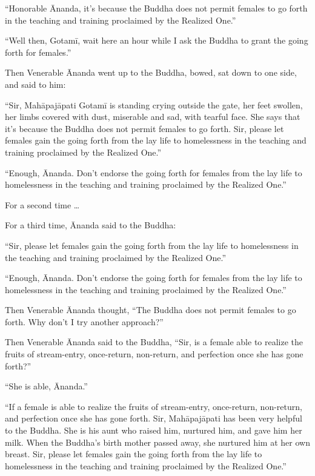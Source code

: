 \documentclass[12pt,openany]{book}%
\begin{document}
“Honorable Ānanda, it’s because the Buddha does not permit females to go forth in the teaching and training proclaimed by the Realized One.” 

“Well then, \textsanskrit{Gotamī}, wait here an hour while I ask the Buddha to grant the going forth for females.” 

Then Venerable Ānanda went up to the Buddha, bowed, sat down to one side, and said to him: 

“Sir, \textsanskrit{Mahāpajāpati} \textsanskrit{Gotamī} is standing crying outside the gate, her feet swollen, her limbs covered with dust, miserable and sad, with tearful face. She says that it’s because the Buddha does not permit females to go forth. Sir, please let females gain the going forth from the lay life to homelessness in the teaching and training proclaimed by the Realized One.” 

“Enough, Ānanda. Don’t endorse the going forth for females from the lay life to homelessness in the teaching and training proclaimed by the Realized One.” 

For a second time … 

For a third time, Ānanda said to the Buddha: 

“Sir, please let females gain the going forth from the lay life to homelessness in the teaching and training proclaimed by the Realized One.” 

“Enough, Ānanda. Don’t endorse the going forth for females from the lay life to homelessness in the teaching and training proclaimed by the Realized One.” 

Then Venerable Ānanda thought, “The Buddha does not permit females to go forth. Why don’t I try another approach?” 

Then Venerable Ānanda said to the Buddha, “Sir, is a female able to realize the fruits of stream-entry, once-return, non-return, and perfection once she has gone forth?” 

“She is able, Ānanda.” 

“If a female is able to realize the fruits of stream-entry, once-return, non-return, and perfection once she has gone forth. Sir, \textsanskrit{Mahāpajāpati} has been very helpful to the Buddha. She is his aunt who raised him, nurtured him, and gave him her milk. When the Buddha’s birth mother passed away, she nurtured him at her own breast. Sir, please let females gain the going forth from the lay life to homelessness in the teaching and training proclaimed by the Realized One.” 
\end{document}
